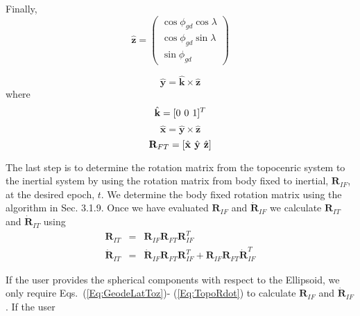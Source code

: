 {%
Finally,
%
\begin{equation}
     \hat{\mathbf{z}} = \left(
     \begin{array}{cc}
          \cos{\phi_{gd}}\cos{\lambda}\\
          \cos{\phi_{gd}}\sin{\lambda}\\
          \sin{\phi_{gd}}
     \end{array}
     \right) \label{Eq:GeodeLatToz}
\end{equation}

\begin{equation}
     \hat{\mathbf{y}} = \hat{\mathbf{k}}
     \times \hat{\mathbf{z}}
\end{equation}
%
where
%
\begin{equation}
     \hat{\mathbf{k}} = [0 \hspace{.05 in} 0 \hspace{.05 in} 1]^T
\end{equation}
%
\begin{equation}
     \hat{\mathbf{x}} = \hat{\mathbf{y}}
     \times \hat{\mathbf{z}}
\end{equation}
%
\begin{equation}
     \mathbf{R}_{FT} = [\hat{\mathbf{x}} \hspace{.05 in} \hat{\mathbf{y}}\hspace{.05 in} \hat{\mathbf{z}}]
\end{equation}

The last step is to determine the rotation matrix from the
topocenric system to the inertial system by using the rotation
matrix from body fixed to inertial, $\mathbf{R}_{IF}$, at the
desired epoch, $t$.  We determine the body fixed rotation matrix
using the algorithm in Sec. 3.1.9.  Once we have evaluated
$\mathbf{R}_{IF}$ and $\dot{\mathbf{R}}_{IF}$ we calculate
$\mathbf{R}_{IT}$ and $\dot{\mathbf{R}}_{IT}$ using
%
\begin{eqnarray}
      \mathbf{R}_{IT} &=& \mathbf{R}_{IF}
      \mathbf{R}_{FT}\mathbf{R}_{IF}^T\\
%
      \dot{\mathbf{R}}_{IT} &=& \dot{\mathbf{R}}_{IF}
      \mathbf{R}_{FT}\mathbf{R}_{IF}^T + \mathbf{R}_{IF}
      \mathbf{R}_{FT}\dot{\mathbf{R}}_{IF}^T \label{Eq:TopoRdot}
\end{eqnarray}

If the user provides the spherical components with respect to the
Ellipsoid, we only require Eqs.~(\ref{Eq:GeodeLatToz})-
(\ref{Eq:TopoRdot}) to calculate  $\mathbf{R}_{IF}$ and
$\dot{\mathbf{R}}_{IF}$ . If the user


}
